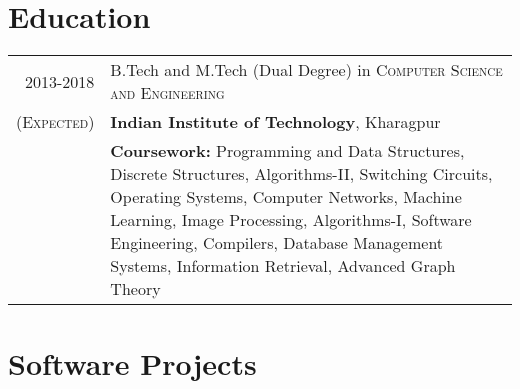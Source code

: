 \documentclass[a4paper,10pt]{article} %
\begin{document}
\section{Education}

\begin{tabular}{r|p{17cm}}	
2013-2018 & B.Tech and M.Tech (Dual Degree) in \textsc{Computer Science and Engineering}\\
\textsc{(Expected)}&\textbf{Indian Institute of Technology}, Kharagpur\\
&\textbf{Coursework: }{Programming and Data Structures, Discrete Structures, Algorithms-II, Switching Circuits, Operating Systems, Computer Networks, Machine Learning, Image Processing, Algorithms-I, Software Engineering, Compilers, Database Management Systems, Information Retrieval, Advanced Graph Theory}
\end{tabular}


\section{Software Projects}
\end{document}
